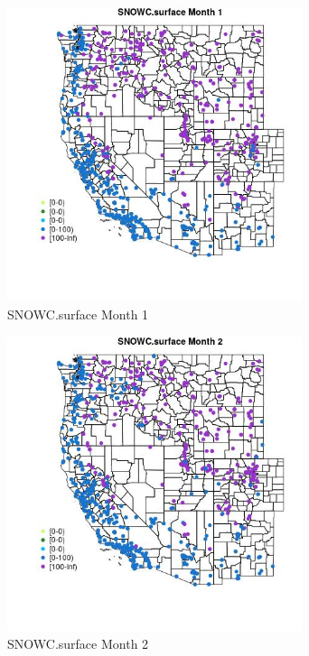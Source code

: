 \begin{figure} 
\centering  
\includegraphics[width=0.77\textwidth]{Code_Outputs/Report_ML_input_PM25_Step4_part_f_de_duplicated_aveswNAs_MapObsMo1SNOWCsurface.jpg} 
\caption{\label{fig:Report_ML_input_PM25_Step4_part_f_de_duplicated_aveswNAsMapObsMo1SNOWCsurface}SNOWC.surface Month 1} 
\end{figure} 
 

\begin{figure} 
\centering  
\includegraphics[width=0.77\textwidth]{Code_Outputs/Report_ML_input_PM25_Step4_part_f_de_duplicated_aveswNAs_MapObsMo2SNOWCsurface.jpg} 
\caption{\label{fig:Report_ML_input_PM25_Step4_part_f_de_duplicated_aveswNAsMapObsMo2SNOWCsurface}SNOWC.surface Month 2} 
\end{figure} 
 

